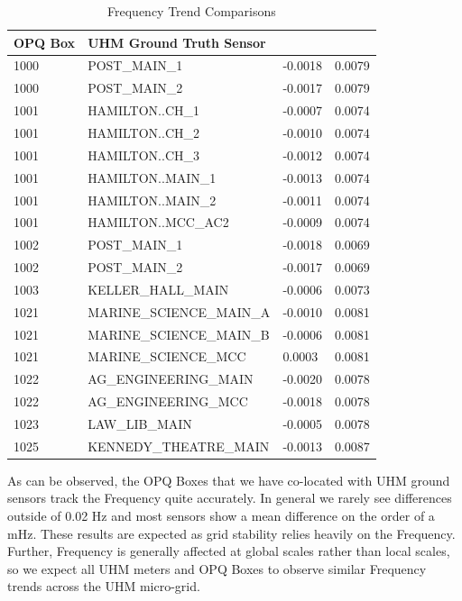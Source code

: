 \begin{table}[H]
    \centering
    \caption{Frequency Trend Comparisons}
    \begin{tabularx}{\textwidth}{lXll}
        \toprule
        \textbf{OPQ Box} & \textbf{UHM Ground Truth Sensor} & \boldmath{$\mu$} & \boldmath{$\sigma$} \\
        \midrule
        1000 & POST\_MAIN\_1 & -0.0018 & 0.0079 \\
        1000 & POST\_MAIN\_2 & -0.0017 & 0.0079 \\
        1001 & HAMILTON..CH\_1 & -0.0007 & 0.0074 \\
        1001 & HAMILTON..CH\_2 & -0.0010 & 0.0074 \\
        1001 & HAMILTON..CH\_3 & -0.0012 & 0.0074 \\
        1001 & HAMILTON..MAIN\_1 & -0.0013 & 0.0074 \\
        1001 & HAMILTON..MAIN\_2 & -0.0011 & 0.0074 \\
        1001 & HAMILTON..MCC\_AC2 & -0.0009 & 0.0074 \\
        1002 & POST\_MAIN\_1 & -0.0018 & 0.0069 \\
        1002 & POST\_MAIN\_2 & -0.0017 & 0.0069 \\
        1003 & KELLER\_HALL\_MAIN & -0.0006 & 0.0073 \\
        1021 & MARINE\_SCIENCE\_MAIN\_A & -0.0010 & 0.0081 \\
        1021 & MARINE\_SCIENCE\_MAIN\_B & -0.0006 & 0.0081 \\
        1021 & MARINE\_SCIENCE\_MCC & 0.0003 & 0.0081 \\
        1022 & AG\_ENGINEERING\_MAIN & -0.0020 & 0.0078 \\
        1022 & AG\_ENGINEERING\_MCC & -0.0018 & 0.0078 \\
        1023 & LAW\_LIB\_MAIN & -0.0005 & 0.0078 \\
        1025 & KENNEDY\_THEATRE\_MAIN & -0.0013 & 0.0087 \\
        \bottomrule
    \end{tabularx}
    \label{table:gt_f}
\end{table}

As can be observed, the OPQ Boxes that we have co-located with UHM ground sensors track the Frequency quite accurately. In general we rarely see differences outside of 0.02 Hz and most sensors show a mean difference on the order of a mHz. These results are expected as grid stability relies heavily on the Frequency. Further, Frequency is generally affected at global scales rather than local scales, so we expect all UHM meters and OPQ Boxes to observe similar Frequency trends across the UHM micro-grid.

